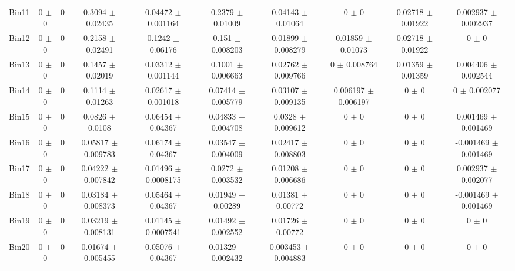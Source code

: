 \begin{tabular}{@{\extracolsep{4pt}}lccccccccc@{}}
     Bin11 & 0 $\pm$ 0 & 0 & 0.3094 $\pm$ 0.02435 & 0.04472 $\pm$ 0.001164 & 0.2379 $\pm$ 0.01009 & 0.04143 $\pm$ 0.01064 & 0 $\pm$ 0 & 0.02718 $\pm$ 0.01922 & 0.002937 $\pm$ 0.002937 \\ 
     Bin12 & 0 $\pm$ 0 & 0 & 0.2158 $\pm$ 0.02491 & 0.1242 $\pm$ 0.06176 & 0.151 $\pm$ 0.008203 & 0.01899 $\pm$ 0.008279 & 0.01859 $\pm$ 0.01073 & 0.02718 $\pm$ 0.01922 & 0 $\pm$ 0 \\ 
     Bin13 & 0 $\pm$ 0 & 0 & 0.1457 $\pm$ 0.02019 & 0.03312 $\pm$ 0.001144 & 0.1001 $\pm$ 0.006663 & 0.02762 $\pm$ 0.009766 & 0 $\pm$ 0.008764 & 0.01359 $\pm$ 0.01359 & 0.004406 $\pm$ 0.002544 \\ 
     Bin14 & 0 $\pm$ 0 & 0 & 0.1114 $\pm$ 0.01263 & 0.02617 $\pm$ 0.001018 & 0.07414 $\pm$ 0.005779 & 0.03107 $\pm$ 0.009135 & 0.006197 $\pm$ 0.006197 & 0 $\pm$ 0 & 0 $\pm$ 0.002077 \\ 
     Bin15 & 0 $\pm$ 0 & 0 & 0.0826 $\pm$ 0.0108 & 0.06454 $\pm$ 0.04367 & 0.04833 $\pm$ 0.004708 & 0.0328 $\pm$ 0.009612 & 0 $\pm$ 0 & 0 $\pm$ 0 & 0.001469 $\pm$ 0.001469 \\ 
     Bin16 & 0 $\pm$ 0 & 0 & 0.05817 $\pm$ 0.009783 & 0.06174 $\pm$ 0.04367 & 0.03547 $\pm$ 0.004009 & 0.02417 $\pm$ 0.008803 & 0 $\pm$ 0 & 0 $\pm$ 0 & -0.001469 $\pm$ 0.001469 \\ 
     Bin17 & 0 $\pm$ 0 & 0 & 0.04222 $\pm$ 0.007842 & 0.01496 $\pm$ 0.0008175 & 0.0272 $\pm$ 0.003532 & 0.01208 $\pm$ 0.006686 & 0 $\pm$ 0 & 0 $\pm$ 0 & 0.002937 $\pm$ 0.002077 \\ 
     Bin18 & 0 $\pm$ 0 & 0 & 0.03184 $\pm$ 0.008373 & 0.05464 $\pm$ 0.04367 & 0.01949 $\pm$ 0.00289 & 0.01381 $\pm$ 0.00772 & 0 $\pm$ 0 & 0 $\pm$ 0 & -0.001469 $\pm$ 0.001469 \\ 
     Bin19 & 0 $\pm$ 0 & 0 & 0.03219 $\pm$ 0.008131 & 0.01145 $\pm$ 0.0007541 & 0.01492 $\pm$ 0.002552 & 0.01726 $\pm$ 0.00772 & 0 $\pm$ 0 & 0 $\pm$ 0 & 0 $\pm$ 0 \\ 
     Bin20 & 0 $\pm$ 0 & 0 & 0.01674 $\pm$ 0.005455 & 0.05076 $\pm$ 0.04367 & 0.01329 $\pm$ 0.002432 & 0.003453 $\pm$ 0.004883 & 0 $\pm$ 0 & 0 $\pm$ 0 & 0 $\pm$ 0 \\ 
\hline\hline
  \end{tabular}
